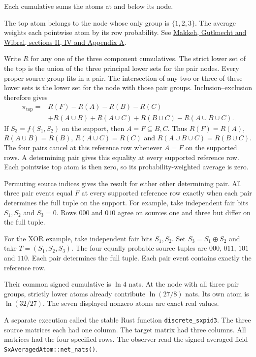 \documentclass[11pt]{article}
\begin{document}
Each cumulative sums the atoms at and below its node.

The top atom belongs to the node whose only group is $\{1,2,3\}$.
The average weights each pointwise atom by its row probability.
See \href{https://arxiv.org/abs/2002.03356v5}{Makkeh, Gutknecht and Wibral,
sections II, IV and Appendix A}.

Write $R$ for any one of the three component cumulatives. The strict lower
set of the top is the union of the three principal lower sets for the pair
nodes. Every proper source group fits in a pair. The intersection of any
two or three of these lower sets is the lower set for the node with those
pair groups. Inclusion--exclusion therefore gives
\[
\begin{aligned}
\pi_{\mathrm{top}}={}&R(F)-R(A)-R(B)-R(C)\\
 &+R(A\cup B)+R(A\cup C)+R(B\cup C)-R(A\cup B\cup C).
\end{aligned}
\]
If $S_3=f(S_1,S_2)$ on the support, then $A=F\subseteq B,C$. Thus
$R(F)=R(A)$, $R(A\cup B)=R(B)$, $R(A\cup C)=R(C)$ and
$R(A\cup B\cup C)=R(B\cup C)$. The four pairs cancel at this reference row whenever $A=F$ on the supported rows.
A determining pair gives this equality at every supported reference row.
Each pointwise top atom is then zero, so its probability-weighted average is zero.

Permuting source indices gives the result for either other determining pair.
All three pair events equal $F$ at every supported reference row exactly when each
pair determines the full tuple on the support. For example,
take independent fair bits $S_1,S_2$ and $S_3=0$. Rows $000$ and $010$
agree on sources one and three but differ on the full tuple.

For the XOR example, take independent fair bits $S_1,S_2$. Set
$S_3=S_1\oplus S_2$ and take $T=(S_1,S_2,S_3)$. The four equally probable
source tuples are $000$, $011$, $101$ and $110$. Each pair determines the
full tuple. Each pair event contains exactly the reference row.

Their common signed cumulative is
$\ln4$ nats. At the node with all three pair groups, strictly lower atoms
already contribute $\ln(27/8)$ nats. Its own atom is $\ln(32/27)$.
The seven displayed nonzero atoms are exact real values.

A separate execution called the stable Rust function
\texttt{discrete\_sxpid3}. The three source matrices each had one column.
The target matrix had three columns. All matrices had the four specified rows.
The observer read the signed averaged field
\verb|SxAveragedAtom::net_nats()|.
\end{document}
